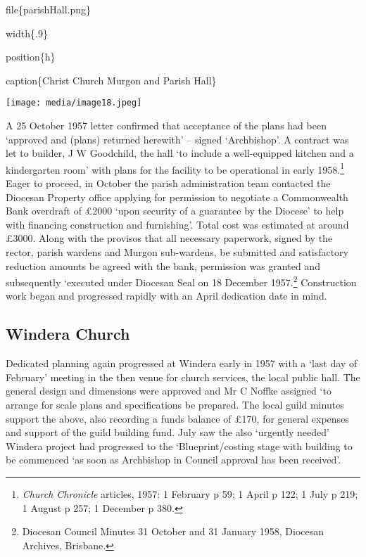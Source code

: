 file\{parishHall.png\}

width\{.9\}

position\{h\}

caption\{Christ Church Murgon and Parish Hall\}

\texttt{[image: media/image18.jpeg]}

A 25 October 1957 letter confirmed that acceptance of the plans had been
`approved and (plans) returned herewith' -- signed `Archbishop'. A
contract was let to builder, J W Goodchild, the hall `to include a
well-equipped kitchen and a kindergarten room' with plans for the
facility to be operational in early 1958.\footnote{\emph{Church
  Chronicle} articles, 1957: 1 February p 59; 1 April p 122; 1 July p
  219; 1 August p 257; 1 December p 380.} Eager to proceed, in October
the parish administration team contacted the Diocesan Property office
applying for permission to negotiate a Commonwealth Bank overdraft of
£2000 `upon security of a guarantee by the Diocese' to help with
financing construction and furnishing'. Total cost was estimated at
around £3000. Along with the provisos that all necessary paperwork,
signed by the rector, parish wardens and Murgon sub-wardens, be
submitted and satisfactory reduction amounts be agreed with the bank,
permission was granted and subsequently `executed under Diocesan Seal on
18 December 1957.\footnote{Diocesan Council Minutes 31 October and 31
  January 1958, Diocesan Archives, Brisbane.} Construction work began
and progressed rapidly with an April dedication date in mind.

\hypertarget{windera-church}{%
\subsection{Windera Church}\label{windera-church}}

Dedicated planning again progressed at Windera early in 1957 with a
`last day of February' meeting in the then venue for church services,
the local public hall. The general design and dimensions were approved
and Mr C Noffke assigned `to arrange for scale plans and specifications
be prepared. The local guild minutes support the above, also recording a
funds balance of £170, for general expenses and support of the guild
building fund. July saw the also `urgently needed' Windera project had
progressed to the `Blueprint/costing stage with building to be commenced
`as soon as Archbishop in Council approval has been received'.

